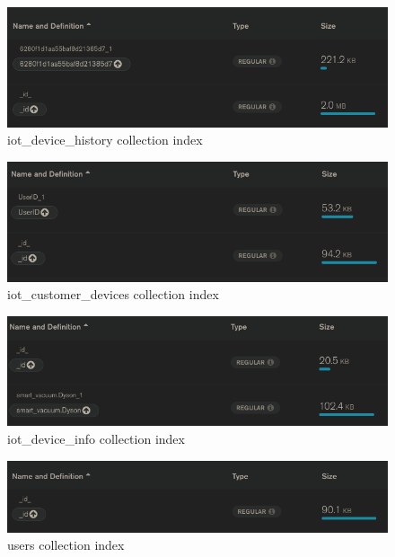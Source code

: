 \begin{figure}[H]
\includegraphics[scale=0.55]{img/iot_device_history-index.jpeg}
\centering
\caption{iot{\_}device{\_}history collection index}
\end{figure}


\begin{figure}[H]
\includegraphics[scale=0.55]{img/iot_customer_devices-index.jpeg}
\centering
\caption{iot{\_}customer{\_}devices collection index}
\end{figure}


\begin{figure}[H]
\includegraphics[scale=0.55]{img/iot_device_info-index.jpeg
}
\centering
\caption{iot{\_}device{\_}info collection index}
\end{figure}


\begin{figure}[H]
\includegraphics[scale=0.55]{img/users-index.jpeg}
\centering
\caption{users collection index}
\end{figure}

